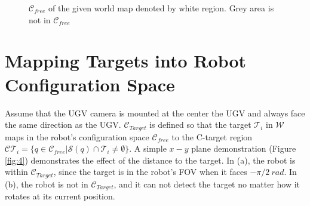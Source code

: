 \documentclass[12pt,draftcls,onecolumn]{IEEEtran}
\begin{document}
\begin{figure}[htp]
  \centering
  \quad
  \caption{ $\mathcal{C}_{free}$  of the given world map denoted by white region. Grey area is not in  $\mathcal{C}_{free}$ }
  \label{fig:6}
\end{figure}


\clearpage


\section{Mapping Targets into Robot Configuration Space} 


Assume that the UGV camera is mounted at the center the UGV and always face the same direction as the UGV.
$\mathcal{C}_{Target}$  is defined so that the target $\mathcal{T}_i$ in $\mathcal{W}$ maps  in the robot's configuration space  $\mathcal{C}_{free}$ to the C-target region  $\mathcal{CT}_i = \{q \in \mathcal{C}_{free}    |    \mathcal{S}(q) \cap \mathcal{T}_i  \neq  \emptyset \}$.
A simple $x-y$ plane demonstration (Figure \ref{fig:4}) demonstrates the effect of the distance to the target.
In (a), the robot is within $\mathcal{C}_{Target}$, since the target is in the robot's FOV when it faces $-\pi/2 \: rad$.
In (b), the robot is not in $\mathcal{C}_{Target}$, and it can not detect the target no matter how it rotates at its current position. 
\end{document}
